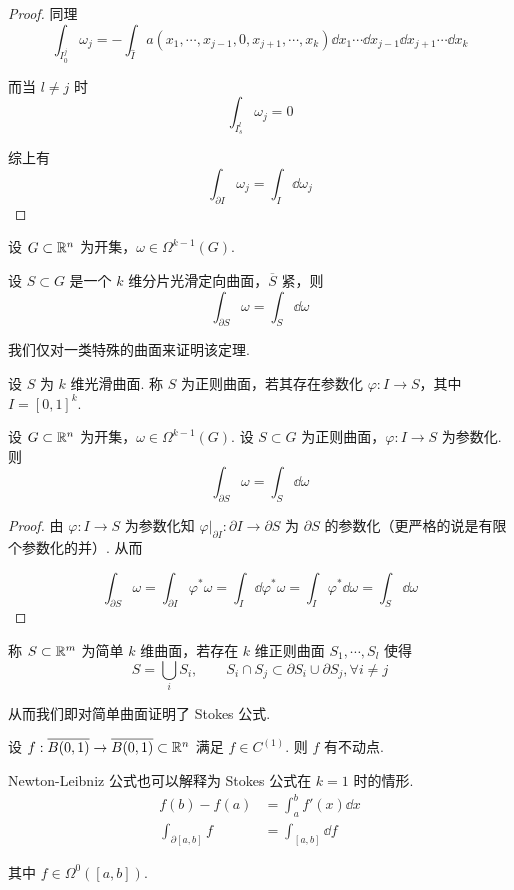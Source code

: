 \begin{proof}
    同理
$$
\int_{I_0^j}\omega_j=-\int_{\hat{I}}a(x_1,\cdots,x_{j-1},0,x_{j+1},\cdots,x_k)\dd x_1\cdots\dd x_{j-1}\dd x_{j+1}\cdots\dd x_{k}
$$

    而当 $l\ne j$ 时
$$
\int_{I_s^l}\omega_j=0
$$

    综上有
$$
\int_{\partial I}\omega_j=\int_I\dd\omega_j
$$
\end{proof}


\begin{theorem}
    设 $G\subset\mathbb{R}^n$ 为开集，$\omega\in\Omega^{k-1}(G)$.

    设 $S\subset G$ 是一个 $k$ 维分片光滑定向曲面，$\overline{S}$ 紧，则
$$
\int_{\partial S}\omega=\int_S\dd\omega
$$
\end{theorem}

我们仅对一类特殊的曲面来证明该定理.

\begin{definition}
    设 $S$ 为 $k$ 维光滑曲面. 称 $S$ 为正则曲面，若其存在参数化 $\varphi:I\to S$，其中 $I=[0,1]^k$.
\end{definition}

\begin{lemma}
    设 $G\subset\mathbb{R}^n$ 为开集，$\omega\in\Omega^{k-1}(G)$. 设 $S\subset G$ 为正则曲面，$\varphi:I\to S$ 为参数化. 则
$$
\int_{\partial S}\omega=\int_S\dd\omega
$$
\end{lemma}
\begin{proof}
    由 $\varphi:I\to S$ 为参数化知 $\varphi|_{\partial I}:\partial I\to\partial S$ 为 $\partial S$ 的参数化（更严格的说是有限个参数化的并）. 从而

$$
\int_{\partial S}\omega=\int_{\partial I}\varphi^*\omega=\int_I\dd\varphi^*\omega=\int_I\varphi^*\dd\omega=\int_S\dd\omega
$$
\end{proof}

\begin{definition}
    称 $S\subset\mathbb{R}^m$ 为简单 $k$ 维曲面，若存在 $k$ 维正则曲面 $S_1,\cdots,S_l$ 使得
$$
S=\bigcup_{i}S_i,\qquad S_i\cap S_j\subset\partial S_i\cup\partial S_j,\forall i\ne j
$$
\end{definition}

从而我们即对简单曲面证明了 Stokes 公式.

\begin{example}
    设 $f:\overline{B(0,1)}\to\overline{B(0,1)}\subset\mathbb{R}^n$ 满足 $f\in C^{(1)}$. 则 $f$ 有不动点.
\end{example}

\begin{hint}
    Newton-Leibniz 公式也可以解释为 Stokes 公式在 $k=1$ 时的情形.
$$
\begin{aligned}
    f(b)-f(a)&=\int_a^bf'(x)\dd x\\
    \int_{\partial[a,b]}f&=\int_{[a,b]}\dd f
\end{aligned}
$$

    其中 $f\in\Omega^0([a,b])$.
\end{hint}